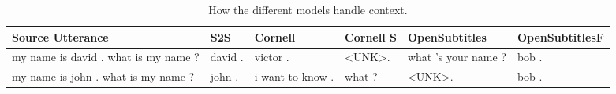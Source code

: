 \documentclass[12pt]{article}
\begin{document}
\begin{table}[H]
	\centering
	\begin{tabular}{|L{2.3cm}|L{2.3cm}|L{2.3cm}|L{2.3cm}|L{2.3cm}|L{2.3cm}|}
		\hline
		\textbf{Source Utterance} & \textbf{S2S} & \textbf{Cornell} & \textbf{Cornell S} & \textbf{OpenSubtitles} & \textbf{OpenSubtitlesF}\\ \hline
		my name is david . what is my name ? & david . & victor . & \textless UNK\textgreater . & what 's your name ? & bob .
		\\ \hline
		my name is john . what is my name ? & john . & i want to know . & what ? & \textless UNK\textgreater . & bob .
		\\ \hline
		
	\end{tabular}
	\caption{How the different models handle context.}	
	\label{table:contextNCM}
\end{table}
\end{document}
